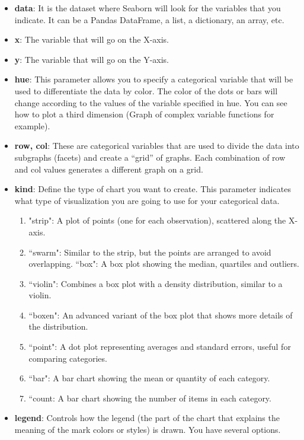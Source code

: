 \documentclass[10pt]{extarticle}
\begin{document}
\begin{itemize}
    \item \textbf{data}: It is the dataset where Seaborn will look for the variables that you indicate. It can be a Pandas DataFrame, a list, a dictionary, an array, etc.
    \item \textbf{x}: The variable that will go on the X-axis.
    \item \textbf{y}: The variable that will go on the Y-axis.
    \item \textbf{hue}: This parameter allows you to specify a categorical variable that will be used to differentiate the data by color. The color of the dots or bars will change according to the values of the variable specified in hue. You can see how to plot a third dimension (Graph of complex variable functions for example).
    \item \textbf{row, col}:
    These are categorical variables that are used to divide the data into subgraphs (facets) and create a “grid” of graphs. Each combination of row and col values generates a different graph on a grid.
    \item \textbf{kind}: Define the type of chart you want to create. This parameter indicates what type of visualization you are going to use for your categorical data.
    \begin{enumerate}
        \item "strip": A plot of points (one for each observation), scattered along the X-axis.
        \item “swarm": Similar to the strip, but the points are arranged to avoid overlapping.
        “box": A box plot showing the median, quartiles and outliers.
        \item “violin": Combines a box plot with a density distribution, similar to a violin.
        \item “boxen": An advanced variant of the box plot that shows more details of the distribution.
        \item “point": A dot plot representing averages and standard errors, useful for comparing categories.
        \item “bar": A bar chart showing the mean or quantity of each category.
        \item “count: A bar chart showing the number of items in each category.
    \end{enumerate}
    \item \textbf{legend}: Controls how the legend (the part of the chart that explains the meaning of the mark colors or styles) is drawn. You have several options.

\end{itemize}
\end{document}
